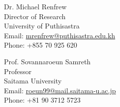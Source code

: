 \documentclass[10pt,a4paper]{article}
\begin{document}
\vspace{1.5em}

\parbox{0.5\textwidth}{ %
	Dr. Michael Renfrew\\ 
	Director of Research\\
	University of Puthisastra\\ 
	Email: \href{mailto: mrenfrew@puthisastra.edu.kh}{mrenfrew@puthisastra.edu.kh}\\
	Phone: +855 70 925 620
}
\hfill %
\parbox{0.5\textwidth}{ %
	Prof. Sovannaroeun Samreth \\ 
	Professor \\
	Saitama University \\
	Email: \href{mailto: roeun99@mail.saitama-u.ac.jp}{roeun99@mail.saitama-u.ac.jp}\\
	Phone: +81 90 3712 5723
}
\end{document}
